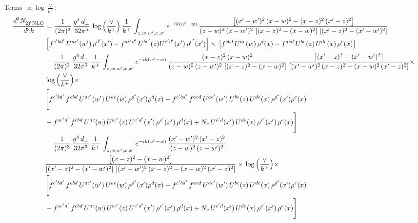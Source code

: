 \documentclass[10pt]{article}
\numberwithin{equation}{section}
\begin{document}
\noindent Terms $\propto\log\frac{\vee}{k^+}$:
\begin{align}
    \frac{d^{3}N_{2f\,\rm NLO}^{\rm}}{d^{3}k}  & =  \frac{1}{(2\pi)^{3}}\, \frac{g^{4}\,d_{\perp}}{32\pi^{5}}\,\log{\left(\frac{\vee}{k^{+}}\right)}\,\frac{1}{k^{+}}\,\int_{z,w,w^{\prime},x,x'} e^{-ik(w^{\prime}-w)}\,\frac{\left[(x'-w')^{2}\, (x-w)^{2} - (x-z)^{2}\, (x'-z)^{2}\right]}{(z-w)^{2}\, (z-w')^{2}\,\left[(x-z)^{2} - (x-w)^{2}\right]\, \left[(x'-z)^{2} - (x'-w')^{2}\right]}\notag \\ &   \left[f^{c'bd'}\, U^{ac'}(w')\,\rho^{d'}(x')-f^{ac'd'}\, U^{bc'}(z)U^{e'd'}(x')\, \rho^{e'}(x')\right]\times\, \left[f^{cbd}\, U^{ac}(w)\,\rho^{d}(x) - f^{acd}\, U^{bc}(z)\,U^{de}(x)\, \rho^{e}(x)\right]  \notag \\
& - \frac{1}{(2\pi)^{3}}\, \frac{g^{4}\,d_{\perp}}{32\pi^{5}}\,\frac{1}{k^{+}}\,\int_{z,w,w^{\prime},x,x'} e^{-ik(w^{\prime}-w)}\,\frac{(x-z)^{2}\, (x-w)^{2}}{(z-w)^{2}\, (z-w')^{2}\,\left[(x-z)^{2} - (x-w)^{2}\right]}\,\frac{\left[(x'-z)^{2}-(x'-w')^{2}\right]}{\left[(x'-w')^{2}\, (x-z)^{2} - (x-w)^{2}\, (x'-z)^{2}\right]}\times\notag \\ & \log{\left(\frac{\vee}{k^{+}}\right)}\times\notag \\ & \Bigg[f^{c'bd'}\,f^{cbd}\, U^{ac'}(w')\,U^{ac}(w)\,\rho^{d'}(x')\rho^{d}(x)- f^{c'bd'}\,f^{acd}\,U^{ac'}(w')\,U^{bc}(z)\,U^{de}(x)\,\rho^{d'}(x')\rho^{e}(x) \notag \\ & -f^{ac'd'}\,f^{cbd}\,U^{ac}(w)\,U^{bc'}(z)\,U^{e'd'}(x')\,\rho^{e'}(x')\,\rho^{d}(x) +N_{c}\,U^{e'd}(x')\,U^{de}(x)\,\rho^{e'}(x')\,\rho^{e}(x)\Bigg]  \notag \\
& + \frac{1}{(2\pi)^{3}}\, \frac{g^{4}\,d_{\perp}}{32\pi^{5}}\,\frac{1}{k^{+}}\,\int_{z,w,w^{\prime},x,x'} e^{-ik(w^{\prime}-w)}\,\frac{(x'-w')^{2}\, (x'-z)^{2}}{(z-w)^{2}\, (z-w')^{2}}\notag \\ & \frac{\left[(x-z)^{2} - (x-w)^{2}\right]}{\left[(x'-z)^{2} - (x'-w')^{2}\right]\, \left[(x'-w')^{2}\, (x - z)^{2} - (x-w)^{2}\,(x'-z)^{2}\right]}\times\, \log{\left(\frac{\vee}{k^{+}}\right)}\times \notag \\ &  \Bigg[f^{c'bd'}\,f^{cbd}\, U^{ac'}(w')\,U^{ac}(w)\,\rho^{d'}(x')\rho^{d}(x)- f^{c'bd'}\,f^{acd}\,U^{ac'}(w')\,U^{bc}(z)\,U^{de}(x)\,\rho^{d'}(x')\rho^{e}(x) \notag \\ & -f^{ac'd'}\,f^{cbd}\,U^{ac}(w)\,U^{bc'}(z)\,U^{e'd'}(x')\,\rho^{e'}(x')\,\rho^{d}(x) +N_{c}\,U^{e'd}(x')\,U^{de}(x)\,\rho^{e'}(x')\,\rho^{e}(x)\Bigg] \label{eq:B:G2I2f}
\end{align}
\end{document}
